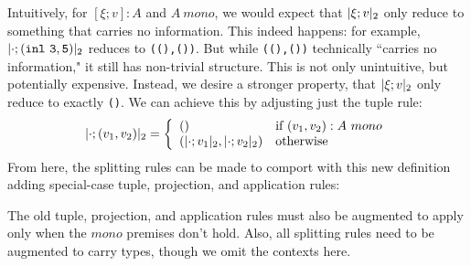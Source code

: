 Intuitively, for $[\xi;v] : A$ and $A~mono$, 
we would expect that $|\xi;v|_{ 2}$ only reduce to something that carries no information.
This indeed happens: for example, $|\cdot;\mathtt{(inl~3,5)}|_{ 2}$ reduces to \texttt{((),())}.
But while \texttt{((),())} technically ``carries no information," it still has non-trivial structure.
This is not only unintuitive, but potentially expensive.
Instead, we desire a stronger property, that $|\xi;v|_{ 2}$ only reduce to exactly \texttt{()}. 
We can achieve this by adjusting just the tuple rule:
\[
|\cdot;(v_1,v_2)|_{ 2} = \left\{ \begin{array}{ll} 
\mathtt{()} &\text{if } (v_1,v_2):A~mono\\ 
(|\cdot;v_1|_{ 2},|\cdot;v_2|_{ 2}) &\text{otherwise} \end{array} \right.
\]
From here, the splitting rules can be made to comport with this new 
definition adding special-case tuple, projection, and application 
rules:
The old tuple, projection, and application rules 
must also be augmented to apply only when the $mono$ premises don't hold.
Also, all splitting rules need to be augmented to carry types, though
we omit the contexts here.
